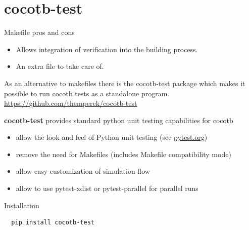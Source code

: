 \documentclass[aspectratio=169]{beamer}
\begin{document}
\section*{cocotb-test}
\begin{frame}[fragile]{\secname}
  \begin{exampleblock}{Makefile pros and cons}
    \begin{itemize}
      \item \color{darkgreen} Allows integration of verification into the building process.
      \item \color{red} An extra file to take care of.
    \end{itemize}
   
  \end{exampleblock}
  
  As an alternative to makefiles there is the cocotb-test package which makes it possible to run cocotb tests as a standalone program.\\
  \color{blue}
  \url{https://github.com/themperek/cocotb-test}
  \color{black}

  {\bf cocotb-test} provides standard python unit testing capabilities for cocotb
  \begin{itemize}
    \item allow the look and feel of Python unit testing (see \url{pytest.org})
    \item remove the need for Makefiles (includes Makefile compatibility mode)
    \item allow easy customization of simulation flow
    \item allow to use pytest-xdist or pytest-parallel for parallel runs
  \end{itemize}

  \begin{block}{Installation}
  \begin{verbatim}
  pip install cocotb-test
  \end{verbatim}
  \end{block}


    
\end{frame}

\end{document}
